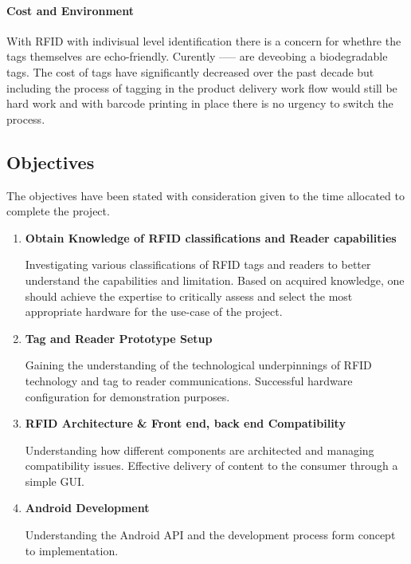 \documentclass[a4paper, 11pt]{article}
\begin{document}
{\paragraph{Cost and Environment} With RFID with indivisual level identification there is a concern for whethre the tags themselves are echo-friendly. Curently ----- are deveobing a biodegradable tags. The cost of tags have significantly decreased over the past decade but including the process of tagging in the product delivery work flow would still be hard work and with barcode printing in place there is no urgency to switch the process.

\subsection{Objectives}

The objectives have been stated with consideration given to the time allocated to complete the project. 

\begin{enumerate}

   \item \textbf{Obtain Knowledge of RFID classifications and Reader capabilities}
   	\begin{flushleft}Investigating various classifications of RFID tags and readers to better understand the capabilities and limitation. Based on acquired knowledge, one should achieve the expertise to critically assess and select the most appropriate hardware for the use-case of the project.
  	\end{flushleft}
	
   \item \textbf{Tag and Reader Prototype Setup}
   	\begin{flushleft}Gaining the understanding of the technological underpinnings of RFID technology and tag to reader communications. Successful hardware configuration for demonstration purposes.
  	\end{flushleft}
  
   \item \textbf{RFID Architecture \&  Front end, back end Compatibility}
   	\begin{flushleft}Understanding how different components are architected and managing compatibility issues. Effective delivery of content to the consumer through a simple GUI.
  	\end{flushleft}
  
   \item \textbf{Android Development}
   	\begin{flushleft}Understanding the Android API and the development process form concept to implementation. 
  	\end{flushleft}
  

\end{enumerate}}
\end{document}

